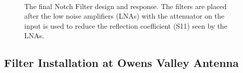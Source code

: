\begin{figure}[ht]
 \centering
{}\\

 \caption{The final Notch Filter design and response. The filters are placed after the low noise amplifiers (LNAs) with the attenuator on the input is used to reduce the reflection coefficient (S11) seen by the LNAs.}
 \label{fig:finalNotchFilter}
\end{figure}


\clearpage

\subsection{Filter Installation at Owens Valley Antenna}

